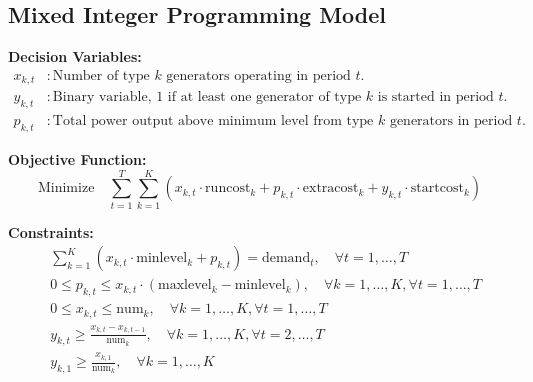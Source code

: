 \documentclass{article}
\begin{document}
\subsection*{Mixed Integer Programming Model}

\textbf{Decision Variables:}
\begin{align*}
x_{k,t} &: \text{Number of type } k \text{ generators operating in period } t. \\
y_{k,t} &: \text{Binary variable, 1 if at least one generator of type } k \text{ is started in period } t. \\
p_{k,t} &: \text{Total power output above minimum level from type } k \text{ generators in period } t.
\end{align*}

\textbf{Objective Function:}
\[
\text{Minimize} \quad \sum_{t=1}^{T} \sum_{k=1}^{K} \left( x_{k,t} \cdot \text{runcost}_k + p_{k,t} \cdot \text{extracost}_k + y_{k,t} \cdot \text{startcost}_k \right)
\]

\textbf{Constraints:}
\begin{align}
& \sum_{k=1}^{K} \left( x_{k,t} \cdot \text{minlevel}_k + p_{k,t} \right) = \text{demand}_t, \quad \forall t = 1, \ldots, T \\
& 0 \leq p_{k,t} \leq x_{k,t} \cdot (\text{maxlevel}_k - \text{minlevel}_k), \quad \forall k = 1, \ldots, K, \forall t = 1, \ldots, T \\
& 0 \leq x_{k,t} \leq \text{num}_k, \quad \forall k = 1, \ldots, K, \forall t = 1, \ldots, T \\
& y_{k,t} \geq \frac{x_{k,t} - x_{k,t-1}}{\text{num}_k}, \quad \forall k = 1, \ldots, K, \forall t = 2, \ldots, T \\
& y_{k,1} \geq \frac{x_{k,1}}{\text{num}_k}, \quad \forall k = 1, \ldots, K
\end{align}
\end{document}
